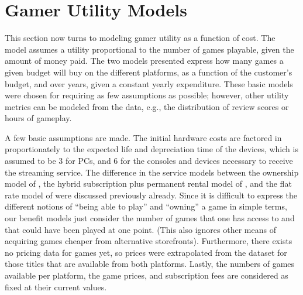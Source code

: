 \section{Gamer Utility Models}
\label{sec:utilitymodel}

This section now turns to modeling gamer utility as a function
of cost. The model assumes a utility proportional to the number
of games playable, given the amount of money paid. The two
models presented express how many games a given budget will
buy on the different platforms, as a function of the customer's
budget, and over years, given a constant yearly expenditure.
These basic models were chosen for requiring as few assumptions
as possible;
however, other utility metrics can be modeled from the data,
e.g., the distribution of review scores or hours of
gameplay.

A few basic assumptions are made. The initial hardware costs are
factored in proportionately to the expected life and depreciation time
of the devices, which is assumed to be \SI{3}{\year} for PCs, and
\SI{6}{\year} for the consoles and devices necessary to receive the
streaming service.
The difference in the service models between the ownership model of
\steam, the hybrid subscription plus permanent rental model of \gfnow,
and the flat rate model of \psnow were discussed previously already.
Since it is difficult to express the different notions of ``being able
to play'' and ``owning'' a game in simple terms, our benefit models just
consider the number of games that one has access to and that could have
been played at one point. (This also ignores other means of acquiring
games cheaper from alternative storefronts).
Furthermore, there exists no pricing data for \gfnow games yet,
so prices were extrapolated from the \steam dataset for those
titles that are available from both platforms.
Lastly, the numbers of games available per platform, the game prices,
and subscription fees are considered as fixed at their current values.


